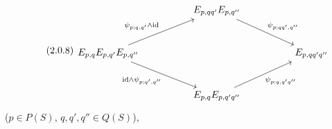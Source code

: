 \begin{equation}\tag{2.0.8}
\begin{tikzcd}[column sep=huge, row sep=large]
 & E_{p,qq'}E_{p,q''} \arrow[rd, "{\psi_{p;qq',q''}}"] & \\
E_{p,q}E_{p,q'}E_{p,q''} \arrow[ru, "{\psi_{p;q,q'}\wedge \mathrm{id}}"] \arrow[rd, "{\mathrm{id}\wedge\psi_{p;q',q''}}"'] & & E_{p,qq'q''} \\
 & E_{p,q}E_{p,q'q''} \arrow[ru, "\psi_{p;q,q'q''}"'] &
\end{tikzcd}
\end{equation}
($p \in P(S)$, $q,q',q'' \in Q(S)$),

